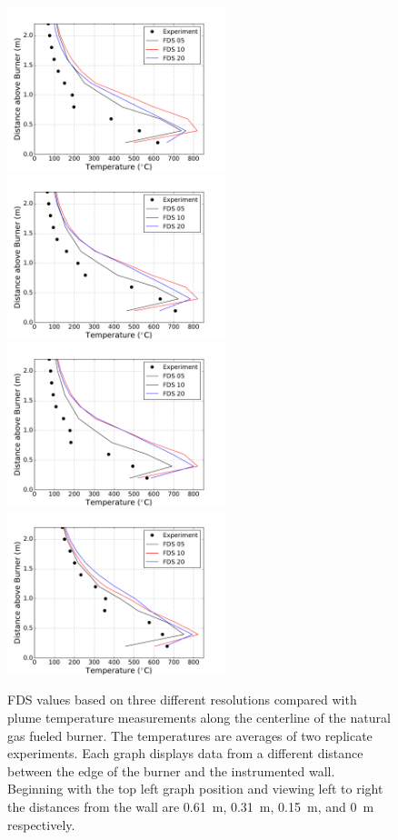 \documentclass[twoside]{uocthesis}
\begin{document}
\begin{figure}[ht!]
  \centering
  \includegraphics[width=2.5in]{../Figures/IWGB_NG_TC_Plume_Avg_2D_RI}
  \includegraphics[width=2.5in]{../Figures/IWGB_NG_TC_Plume_Avg_1D_RI}\\
  \includegraphics[width=2.5in]{../Figures/IWGB_NG_TC_Plume_Avg_0pD_RI}
  \includegraphics[width=2.5in]{../Figures/IWGB_NG_TC_Plume_Avg_0D_RI}\\
  \caption[FDS values based on three different resolutions compared with plume temperature measurements along the centerline of the natural gas fueled burner]{FDS values based on three different resolutions compared with plume temperature measurements along the centerline of the natural gas fueled burner. The temperatures are averages of two replicate experiments. Each graph displays data from a different distance between the edge of the burner and the instrumented wall.  Beginning with the top left graph position and viewing left to right the distances from the wall are 0.61~m, 0.31~m, 0.15~m, and 0~m respectively.}
  \label{FDS_Plume_Grid_TWNG_comp}
\end{figure}
\end{document}
